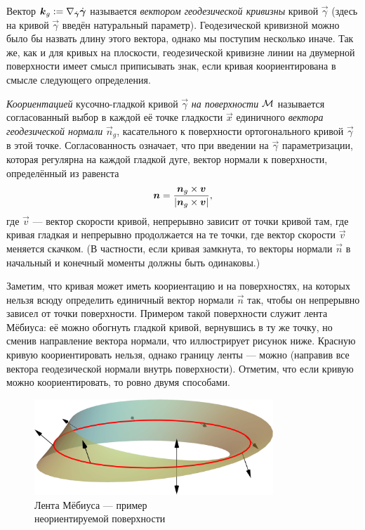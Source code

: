 Вектор $\vec{k}_g \vcentcolon = \nabla_{\dot{\vec{\gamma}}}\dot{\vec{\gamma}}$ называется \textit{вектором геодезической кривизны} кривой $\vec{\gamma}$ (здесь на кривой $\vec{\gamma}$ введён натуральный параметр). Геодезической кривизной можно было бы назвать длину этого вектора, однако мы поступим несколько иначе. Так же, как и для кривых на плоскости, геодезической кривизне линии на двумерной поверхности имеет смысл приписывать знак, если кривая коориентирована в смысле следующего определения.

\begin{definition}
	\textit{Коориентацией} кусочно-гладкой кривой $\vec{\gamma}$ \textit{на поверхности} $\M$ называется согласованный выбор в каждой её точке гладкости $\vec{x}$ единичного \textit{вектора геодезической нормали} $\vec{n}_g$, касательного к поверхности ортогонального кривой $\vec{\gamma}$ в этой точке. Согласованность означает, что при введении на $\vec{\gamma}$ параметризации, которая регулярна на каждой гладкой дуге, вектор нормали к поверхности, определённый из равенста
	\[
		\vec{n} = \frac{\vec{n}_g \times \vec{v}}{\abs{\vec{n}_g \times \vec{v}}},
	\]
	где $\vec{v}$ --- вектор скорости кривой, непрерывно зависит от точки кривой там, где кривая гладкая и непрерывно продолжается на те точки, где вектор скорости $\vec{v}$ меняется скачком. (В частности, если кривая замкнута, то векторы нормали $\vec{n}$ в начальный и конечный моменты должны быть одинаковы.)
\end{definition}

Заметим, что кривая может иметь коориентацию и на поверхностях, на которых нельзя всюду определить единичный вектор нормали $\vec{n}$ так, чтобы он непрерывно зависел от точки поверхности. Примером такой поверхности служит лента Мёбиуса: её можно обогнуть гладкой кривой, вернувшись в ту же точку, но сменив направление вектора нормали, что иллюстрирует рисунок ниже. Красную кривую коориентировать нельзя, однако границу ленты --- можно (направив все вектора геодезической нормали внутрь поверхности). Отметим, что если кривую можно коориентировать, то ровно двумя способами.

\begin{figure}[H]
	\centering
	\includegraphics[width=9cm]{./img/MobiusStrip.pdf}
	\caption{Лента Мёбиуса --- пример\\ неориентируемой поверхности}
\end{figure} %

